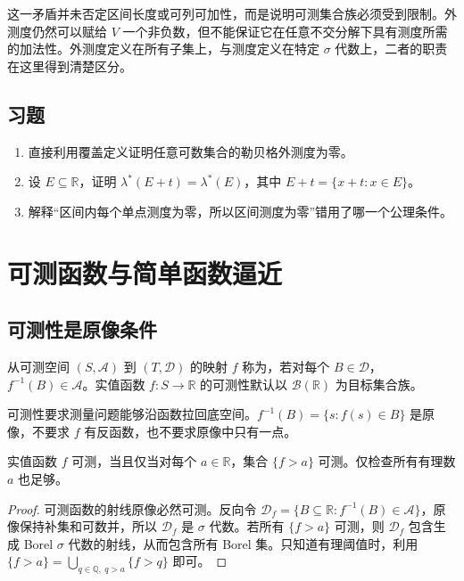\documentclass[UTF8,12pt,a4paper,fontset=fandol]{ctexbook}
\begin{document}
这一矛盾并未否定区间长度或可列可加性，而是说明可测集合族必须受到限制。外测度仍然可以赋给 $V$ 一个非负数，但不能保证它在任意不交分解下具有测度所需的加法性。外测度定义在所有子集上，与测度定义在特定 $\sigma$ 代数上，二者的职责在这里得到清楚区分。

\section{习题}
\begin{enumerate}
 \item 直接利用覆盖定义证明任意可数集合的勒贝格外测度为零。
 \item 设 $E\subseteq\mathbb R$，证明 $\lambda^*(E+t)=\lambda^*(E)$，其中 $E+t=\{x+t:x\in E\}$。
 \item 解释“区间内每个单点测度为零，所以区间测度为零”错用了哪一个公理条件。
\end{enumerate}

\chapter{可测函数与简单函数逼近}
\label{chap:mt-functions}

\section{可测性是原像条件}
\begin{definition}
从可测空间 $(S,\mathcal A)$ 到 $(T,\mathcal D)$ 的映射 $f$ 称为，若对每个 $B\in\mathcal D$，$f^{-1}(B)\in\mathcal A$。实值函数 $f:S\to\mathbb R$ 的可测性默认以 $\mathcal B(\mathbb R)$ 为目标集合族。
\end{definition}
可测性要求测量问题能够沿函数拉回底空间。$f^{-1}(B)=\{s:f(s)\in B\}$ 是原像，不要求 $f$ 有反函数，也不要求原像中只有一点。

\begin{proposition}[生成族判别]
实值函数 $f$ 可测，当且仅当对每个 $a\in\mathbb R$，集合 $\{f>a\}$ 可测。仅检查所有有理数 $a$ 也足够。
\label{prop:mt-measurable-test}
\end{proposition}
\begin{proof}
可测函数的射线原像必然可测。反向令 $\mathcal D_f=\{B\subseteq\mathbb R:f^{-1}(B)\in\mathcal A\}$，原像保持补集和可数并，所以 $\mathcal D_f$ 是 $\sigma$ 代数。若所有 $\{f>a\}$ 可测，则 $\mathcal D_f$ 包含生成 Borel $\sigma$ 代数的射线，从而包含所有 Borel 集。只知道有理阈值时，利用 $\{f>a\}=\bigcup_{q\in\mathbb Q,\ q>a}\{f>q\}$ 即可。
\end{proof}
\end{document}
